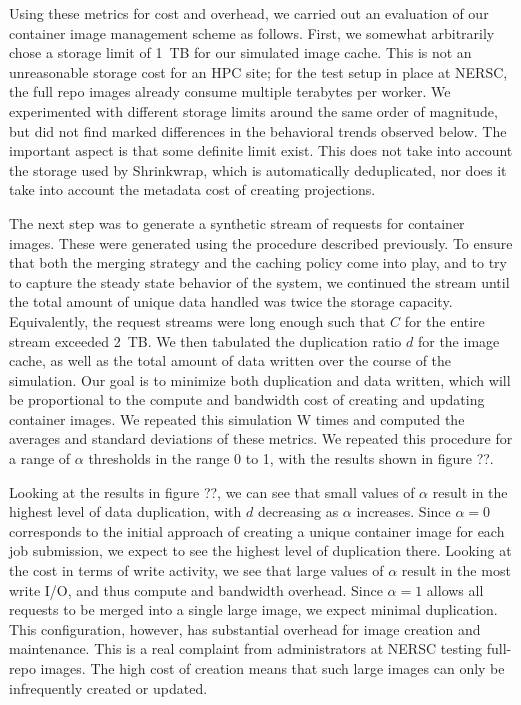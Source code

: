 \documentclass[sigconf]{acmart}
\begin{document}
Using these metrics for cost and overhead,
we carried out an evaluation of our container image management scheme as follows.
First, we somewhat arbitrarily chose a storage limit of 1~TB for our simulated image cache.
This is not an unreasonable storage cost for an HPC site;
for the test setup in place at NERSC,
the full repo images already consume multiple terabytes per worker.
We experimented with different storage limits around the same order of magnitude,
but did not find marked differences in the behavioral trends observed below.
The important aspect is that some definite limit exist.
This does not take into account the storage used by Shrinkwrap,
which is automatically deduplicated,
nor does it take into account the metadata cost of creating projections.

The next step was to generate a synthetic stream of requests for container images.
These were generated using the procedure described previously.
To ensure that both the merging strategy and the caching policy come into play,
and to try to capture the steady state behavior of the system,
we continued the stream until the total amount of unique data handled was twice the storage capacity.
Equivalently, the request streams were long enough such that $C$ for the entire stream exceeded 2~TB.
We then tabulated the duplication ratio $d$ for the image cache,
as well as the total amount of data written over the course of the simulation.
Our goal is to minimize both duplication and data written,
which will be proportional to the compute and bandwidth cost of creating and updating container images.
We repeated this simulation W times and computed the averages and standard deviations of these metrics.
We repeated this procedure for a range of $\alpha$ thresholds in the range 0 to 1,
with the results shown in figure ??.

Looking at the results in figure ??,
we can see that small values of $\alpha$ result in the highest level of data duplication,
with $d$ decreasing as $\alpha$ increases.
Since $\alpha=0$ corresponds to the initial approach of creating a unique container image for each job submission,
we expect to see the highest level of duplication there.
Looking at the cost in terms of write activity,
we see that large values of $\alpha$ result in the most write I/O,
and thus compute and bandwidth overhead.
Since $\alpha=1$ allows all requests to be merged into a single large image,
we expect minimal duplication.
This configuration, however,
has substantial overhead for image creation and maintenance.
This is a real complaint from administrators at NERSC testing full-repo images.
The high cost of creation means that such large images can only be infrequently created or updated.
\fi
\end{document}
